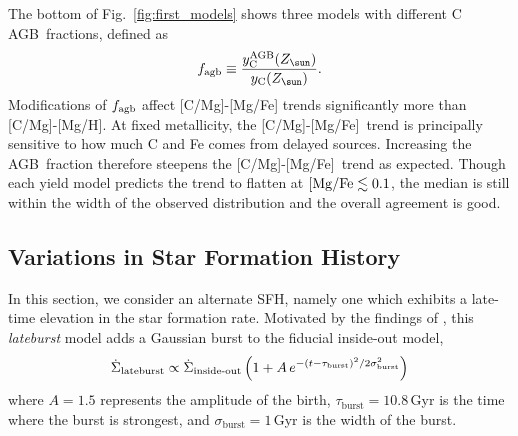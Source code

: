 \documentclass[fleqn,
usenatbib]{mnras}
\newcommand{\JJ}{\citetalias{james+21}}
\newcommand{\agb}{AGB}
\newcommand{\caah}{[C/Mg]-[Mg/H]}
\newcommand{\caafe}{[C/Mg]-[Mg/Fe]}
\newcommand{\Yct}{\ensuremath{y_{\rm C}}}
\newcommand{\Ycagb}{\ensuremath{y_{\rm C}^{\rm AGB}}}
\newcommand{\Zo}{%
    \ifmmode Z_{\sun}%
    \else $Z_{\sun}$%
    \fi}
\begin{document}
The bottom of Fig.~\ref{fig:first_models} shows three models with different C \agb\  fractions, defined as 
\begin{equation}\label{eq:f_agb}
    f_{\rm agb} \equiv \frac{\Ycagb(\Zo)}{\Yct(\Zo)}.
\end{equation}
Modifications of $f_{\rm agb}$ affect \caafe{} trends significantly more than \caah. At fixed metallicity, the \caafe\ trend is principally sensitive to how much C and Fe comes from delayed sources. Increasing the \agb\ fraction therefore steepens the \caafe\ trend as expected. Though each yield model predicts the trend to flatten at ${\rm [Mg/Fe} \lesssim 0.1 $, the median is still within the width of the observed distribution and the overall agreement is good. 








\subsection{Variations in Star Formation History} \label{sec:sfh}

In this section, we consider an alternate SFH, namely one which exhibits a late-time elevation in the star formation rate. Motivated by the findings of \citet[see discussion in \JJ]{mor+19,isern19}, this \textit{lateburst} model
adds a Gaussian burst to the fiducial inside-out model, 
\begin{equation}\label{eq:lateburst}
    \dot{\Sigma}_\text{lateburst} \propto \dot{\Sigma}_\text{inside-out} \left(1 + A\,e^{-(t-\tau_{\rm burst})^2/2\sigma^2_{\rm burst}} \right)
\end{equation}
where $A=1.5$ represents the amplitude of the birth, $\tau_\text{burst}=10.8$\,Gyr is the time where the burst is strongest, and $\sigma_\text{burst}=1$\,Gyr is the width of the burst.
\end{document}
